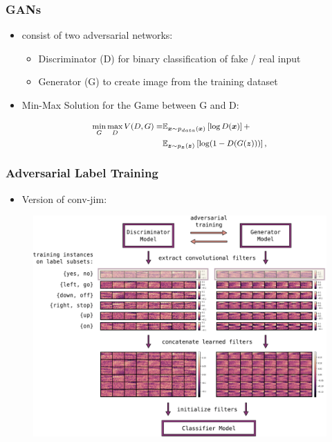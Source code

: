 \begin{frame}
  \frametitle{GANs}
  \vspace{-0.5cm}
  \begin{itemize}
    \item consist of two adversarial networks:
    \begin{itemize}
      \footnotesize
      \item Discriminator (D) for binary classification of fake / real input
      \item Generator (G) to create image from the training dataset
    \end{itemize}
    \item Min-Max Solution for the Game between G and D:
  \end{itemize}
  \begin{equation*}
    \footnotesize
    \begin{aligned}
      \underset{G}{\min} \, \underset{D}{\max} \, V(D, G) = & \mathbb{E}_{\bm{x} \sim p_{data}(\bm{x})}\left[ \log D(\bm{x}) \right] + \\
      & \mathbb{E}_{\bm{z} \sim p_{\bm{z}}(\bm{z})}\left[ \log (1 - D(G(\bm{z}))) \right],
    \end{aligned}
  \end{equation*}
\end{frame}


\begin{frame}
  \frametitle{Adversarial Label Training}
  \vspace{-0.5cm}
  \begin{itemize}
    \item Version of conv-jim:
  \end{itemize}
  \begin{figure} \includegraphics[height=0.5\textheight]{../4_nn/figs/nn_adv_label_scheme.pdf} \end{figure}
\end{frame}


